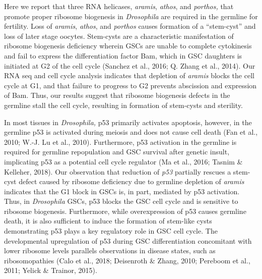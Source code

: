 \documentclass[12pt,oneside]{reedthesis}
\begin{document}
Here we report that three RNA helicases, \emph{aramis}, \emph{athos}, and \emph{porthos,} that promote proper ribosome biogenesis in \emph{Drosophila} are required in the germline for fertility. Loss of \emph{aramis}, \emph{athos}, and \emph{porthos} causes formation of a ``stem-cyst'' and loss of later stage oocytes. Stem-cysts are a characteristic manifestation of ribosome biogenesis deficiency wherein GSCs are unable to complete cytokinesis and fail to express the differentiation factor Bam, which in GSC daughters is initiated at G2 of the cell cycle (Sanchez et al., 2016; Q. Zhang et al., 2014). Our RNA seq and cell cycle analysis indicates that depletion of \emph{aramis} blocks the cell cycle at G1, and that failure to progress to G2 prevents abscission and expression of Bam. Thus, our results suggest that ribosome biogenesis defects in the germline stall the cell cycle, resulting in formation of stem-cysts and sterility.

In most tissues in \emph{Drosophila,} p53 primarily activates apoptosis, however, in the germline p53 is activated during meiosis and does not cause cell death (Fan et al., 2010; W.-J. Lu et al., 2010). Furthermore, p53 activation in the germline is required for germline repopulation and GSC survival after genetic insult, implicating p53 as a potential cell cycle regulator (Ma et al., 2016; Tasnim \& Kelleher, 2018). Our observation that reduction of \emph{p53} partially rescues a stem-cyst defect caused by ribosome deficiency due to germline depletion of \emph{aramis} indicates that the G1 block in GSCs is, in part, mediated by p53 activation. Thus, in \emph{Drosophila} GSCs, p53 blocks the GSC cell cycle and is sensitive to ribosome biogenesis. Furthermore, while overexpression of p53 causes germline death, it is also sufficient to induce the formation of stem-like cysts demonstrating p53 plays a key regulatory role in GSC cell cycle. The developmental upregulation of p53 during GSC differentiation concomitant with lower ribosome levels parallels observations in disease states, such as ribosomopathies (Calo et al., 2018; Deisenroth \& Zhang, 2010; Pereboom et al., 2011; Yelick \& Trainor, 2015).
\end{document}
